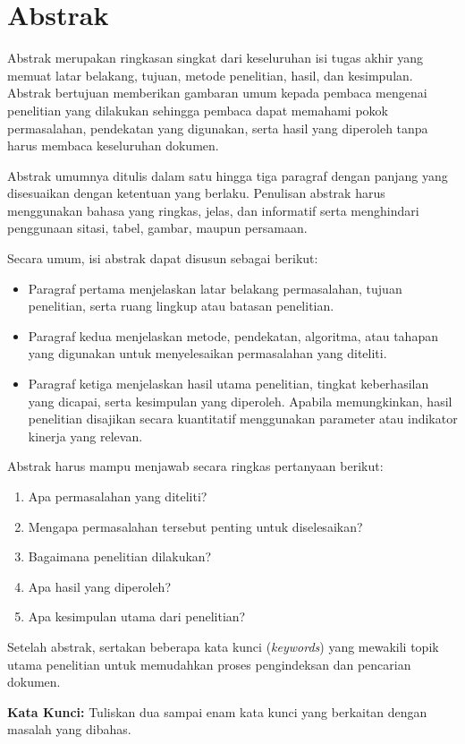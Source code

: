 \chapter*{Abstrak}

\small Abstrak merupakan ringkasan singkat dari keseluruhan isi tugas akhir yang memuat latar belakang, tujuan, metode penelitian, hasil, dan kesimpulan. Abstrak bertujuan memberikan gambaran umum kepada pembaca mengenai penelitian yang dilakukan sehingga pembaca dapat memahami pokok permasalahan, pendekatan yang digunakan, serta hasil yang diperoleh tanpa harus membaca keseluruhan dokumen.

Abstrak umumnya ditulis dalam satu hingga tiga paragraf dengan panjang yang disesuaikan dengan ketentuan yang berlaku. Penulisan abstrak harus menggunakan bahasa yang ringkas, jelas, dan informatif serta menghindari penggunaan sitasi, tabel, gambar, maupun persamaan.

Secara umum, isi abstrak dapat disusun sebagai berikut:

\begin{itemize}[topsep=0pt,itemsep=0pt,parsep=0pt,leftmargin=*]
\item Paragraf pertama menjelaskan latar belakang permasalahan, tujuan penelitian, serta ruang lingkup atau batasan penelitian.
\item Paragraf kedua menjelaskan metode, pendekatan, algoritma, atau tahapan yang digunakan untuk menyelesaikan permasalahan yang diteliti.
\item Paragraf ketiga menjelaskan hasil utama penelitian, tingkat keberhasilan yang dicapai, serta kesimpulan yang diperoleh. Apabila memungkinkan, hasil penelitian disajikan secara kuantitatif menggunakan parameter atau indikator kinerja yang relevan.
\end{itemize}

Abstrak harus mampu menjawab secara ringkas pertanyaan berikut:

\begin{enumerate}[topsep=0pt,itemsep=0pt,parsep=0pt,leftmargin=*]
\item Apa permasalahan yang diteliti?
\item Mengapa permasalahan tersebut penting untuk diselesaikan?
\item Bagaimana penelitian dilakukan?
\item Apa hasil yang diperoleh?
\item Apa kesimpulan utama dari penelitian?
\end{enumerate}

Setelah abstrak, sertakan beberapa kata kunci (\textit{keywords}) yang mewakili topik utama penelitian untuk memudahkan proses pengindeksan dan pencarian dokumen.
\vspace{1em}

\noindent \textbf{Kata Kunci:} Tuliskan dua sampai enam kata kunci yang berkaitan dengan masalah yang dibahas.
